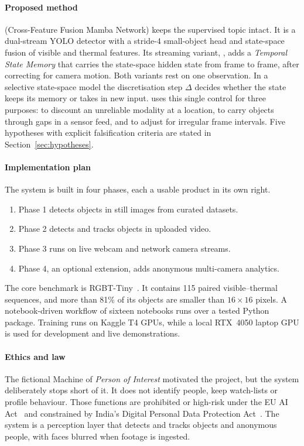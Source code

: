 \paragraph{Proposed method}
\method{} (Cross-Feature Fusion Mamba Network) keeps the supervised topic
intact. It is a dual-stream YOLO detector with a stride-4 small-object head
and state-space fusion of visible and thermal features. Its streaming
variant, \methodS{}, adds a \emph{Temporal State Memory} that carries the
state-space hidden state from frame to frame, after correcting for camera
motion. Both variants rest on one observation. In a selective state-space
model the discretisation step $\Delta$ decides whether the state keeps its
memory or takes in new input. \method{} uses this single control for three
purposes: to discount an unreliable modality at a location, to carry objects
through gaps in a sensor feed, and to adjust for irregular frame intervals.
Five hypotheses with explicit falsification criteria are stated in
Section~\ref{sec:hypotheses}.

\paragraph{Implementation plan}
The system is built in four phases, each a usable product in its own right.
\begin{enumerate}
  \item Phase 1 detects objects in still images from curated datasets.
  \item Phase 2 detects and tracks objects in uploaded video.
  \item Phase 3 runs on live webcam and network camera streams.
  \item Phase 4, an optional extension, adds anonymous multi-camera
        analytics.
\end{enumerate}
The core benchmark is RGBT-Tiny~\citep{ying2025rgbttiny}. It contains 115
paired visible--thermal sequences, and more than 81\% of its objects are
smaller than $16\times16$ pixels. A notebook-driven workflow of sixteen
notebooks runs over a tested Python package. Training runs on Kaggle T4 GPUs,
while a local RTX~4050 laptop GPU is used for development and live
demonstrations.

\paragraph{Ethics and law}
The fictional Machine of \emph{Person of Interest} motivated the project, but
the system deliberately stops short of it. It does not identify people, keep
watch-lists or profile behaviour. Those functions are prohibited or
high-risk under the EU AI Act~\citep{euaiact2024} and constrained by India's
Digital Personal Data Protection Act~\citep{dpdp2023}. The system is a
perception layer that detects and tracks objects and anonymous people, with
faces blurred when footage is ingested.

